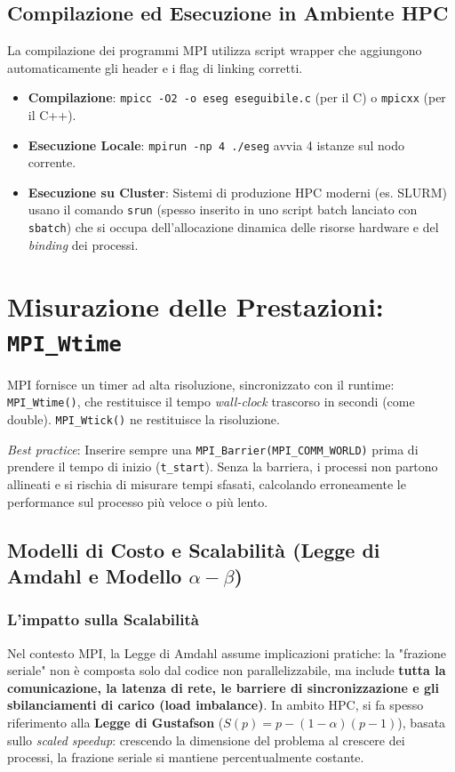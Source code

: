 \subsection{Compilazione ed Esecuzione in Ambiente HPC}
La compilazione dei programmi MPI utilizza script wrapper che aggiungono automaticamente gli header e i flag di linking corretti.
\begin{itemize}
    \item \textbf{Compilazione}: \texttt{mpicc -O2 -o eseg eseguibile.c} (per il C) o \texttt{mpicxx} (per il C++).
    \item \textbf{Esecuzione Locale}: \texttt{mpirun -np 4 ./eseg} avvia 4 istanze sul nodo corrente.
    \item \textbf{Esecuzione su Cluster}: Sistemi di produzione HPC moderni (es. SLURM) usano il comando \texttt{srun} (spesso inserito in uno script batch lanciato con \texttt{sbatch}) che si occupa dell'allocazione dinamica delle risorse hardware e del \textit{binding} dei processi.
\end{itemize}

\section{Misurazione delle Prestazioni: \texttt{MPI\_Wtime}}
MPI fornisce un timer ad alta risoluzione, sincronizzato con il runtime: \texttt{MPI\_Wtime()}, che restituisce il tempo \textit{wall-clock} trascorso in secondi (come double). \texttt{MPI\_Wtick()} ne restituisce la risoluzione.

\vspace{0.2cm}
\noindent
\textit{Best practice}: Inserire sempre una \texttt{MPI\_Barrier(MPI\_COMM\_WORLD)} prima di prendere il tempo di inizio (\texttt{t\_start}). Senza la barriera, i processi non partono allineati e si rischia di misurare tempi sfasati, calcolando erroneamente le performance sul processo più veloce o più lento.

\subsection{Modelli di Costo e Scalabilità (Legge di Amdahl e Modello $\alpha-\beta$)}

\subsubsection{L'impatto sulla Scalabilità}
Nel contesto MPI, la Legge di Amdahl assume implicazioni pratiche: la "frazione seriale" non è composta solo dal codice non parallelizzabile, ma include \textbf{tutta la comunicazione, la latenza di rete, le barriere di sincronizzazione e gli sbilanciamenti di carico (load imbalance)}. 
\newline In ambito HPC, si fa spesso riferimento alla \textbf{Legge di Gustafson} ($S(p) = p - (1-\alpha)(p-1)$), basata sullo \textit{scaled speedup}: crescendo la dimensione del problema al crescere dei processi, la frazione seriale si mantiene percentualmente costante.

